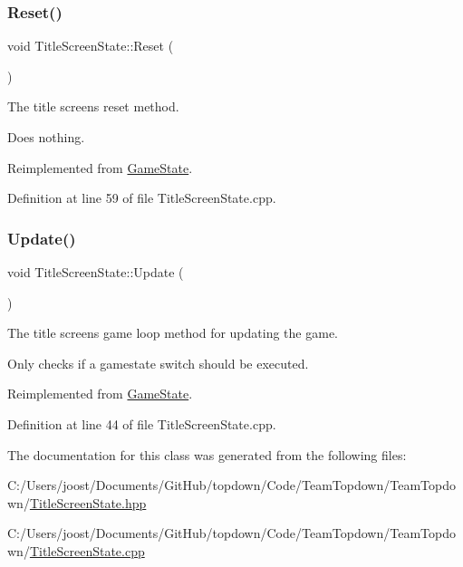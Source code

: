 \mbox{\label{class_title_screen_state_a7e6cf3ef5534f42a4ca1e75045a45c71}} 
\subsubsection{\texorpdfstring{Reset()}{Reset()}}
{\footnotesize\ttfamily void Title\+Screen\+State\+::\+Reset (\begin{DoxyParamCaption}{ }\end{DoxyParamCaption})\hspace{0.3cm}{\ttfamily [virtual]}}



The title screen\textquotesingle{}s reset method. 

Does nothing. 

Reimplemented from \hyperlink{class_game_state_a46ac6317883dff0eba4f8f305af6b6bb}{Game\+State}.



Definition at line 59 of file Title\+Screen\+State.\+cpp.

\mbox{\label{class_title_screen_state_a0db8d35f9d3013155d2e61939d2a47ea}} 
\subsubsection{\texorpdfstring{Update()}{Update()}}
{\footnotesize\ttfamily void Title\+Screen\+State\+::\+Update (\begin{DoxyParamCaption}{ }\end{DoxyParamCaption})\hspace{0.3cm}{\ttfamily [virtual]}}



The title screen\textquotesingle{}s game loop method for updating the game. 

Only checks if a gamestate switch should be executed. 

Reimplemented from \hyperlink{class_game_state_a5be51b634f95bc6e57066ad6931aa18b}{Game\+State}.



Definition at line 44 of file Title\+Screen\+State.\+cpp.



The documentation for this class was generated from the following files\+:\begin{DoxyCompactItemize}
\item 
C\+:/\+Users/joost/\+Documents/\+Git\+Hub/topdown/\+Code/\+Team\+Topdown/\+Team\+Topdown/\hyperlink{_title_screen_state_8hpp}{Title\+Screen\+State.\+hpp}\item 
C\+:/\+Users/joost/\+Documents/\+Git\+Hub/topdown/\+Code/\+Team\+Topdown/\+Team\+Topdown/\hyperlink{_title_screen_state_8cpp}{Title\+Screen\+State.\+cpp}\end{DoxyCompactItemize}
